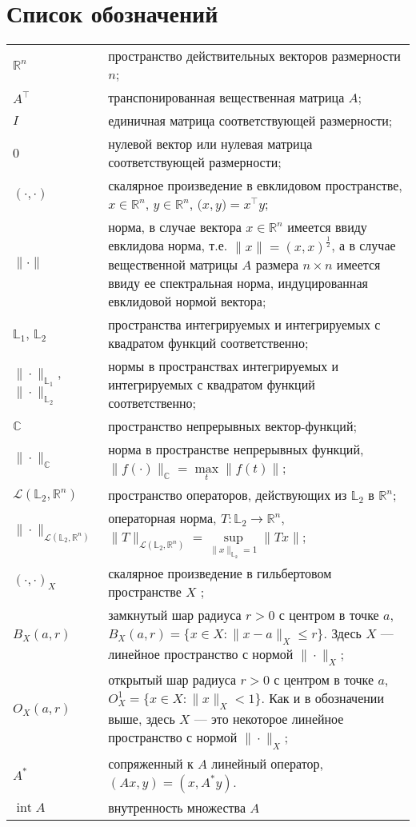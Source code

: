 \documentclass[../main.tex]{subfiles}
\begin{document}
\clearpage
\section*{Список обозначений}
\begin{tabularx}{\textwidth}{lY}
    $\mathbb{R}^n$ & пространство действительных векторов размерности $n$; \\ 
    $A^{\top}$ & транспонированная вещественная матрица $A$; \\ 
    $I$ & единичная матрица соответствующей размерности; \\ 
    $0$ & нулевой вектор или нулевая матрица соответствующей размерности; \\
    $(\cdot,\cdot)$ & скалярное произведение в евклидовом пространстве, $x \in \mathbb{R}^n$, $y \in \mathbb{R}^n$, $ \Big(x, y\Big) = x^{\top} y$; \\
    $\| \cdot\| $ &  норма, в случае вектора $x \in \mathbb{R}^n$ имеется ввиду евклидова норма,  т.е. $\|x\| = (x,x)^{\frac{1}{2}}$, а в случае вещественной  матрицы $A$ размера $n \times n$ имеется ввиду ее спектральная норма, индуцированная евклидовой нормой вектора; \\
    $\mathbb{L}_1$, $\mathbb{L}_2$ & пространства интегрируемых и интегрируемых с квадратом функций соответственно; \\
    $\|\cdot\|_{\mathbb{L}_1}$, $\|\cdot\|_{\mathbb{L}_2}$ & нормы в пространствах интегрируемых и интегрируемых с квадратом функций соответственно; \\
    $ \mathbb{C} $ & пространство непрерывных вектор-функций; \\
    $\|\cdot\|_\mathbb{C}$ & норма в пространстве непрерывных функций, $\|f(\cdot) \|_\mathbb{C} = \max\limits_{t} \|f(t)\|$; \\
    $\mathcal{L}(\mathbb{L}_2, \mathbb{R}^n)$ & пространство операторов, действующих из $\mathbb{L}_2$ в  $\mathbb{R}^n$; \\ 
    $\| \cdot \|_{\mathcal{L}(\mathbb{L}_2, \mathbb{R}^n)}$ &  операторная норма, $T:  \mathbb{L}_2 \to \mathbb{R}^n $, $\| T \|_{\mathcal{L}(\mathbb{L}_2, \mathbb{R}^n)} = \sup\limits_{\|x\|_{\mathbb{L}_2} = 1} \| T x \| $;\\
    $(\cdot,\cdot)_{X}$ & скалярное произведение в гильбертовом пространстве $X$ ; \\
    $B_X(a,r)$ & замкнутый шар радиуса $r>0$ с центром в точке $a$, $B_X(a, r) = \{x\in X: \|x-a\|_X \leqslant r \}$. Здесь $X$ --- линейное пространство с нормой $\|\cdot\|_X$; \\
    $O_{X}(a, r)$  & открытый шар радиуса $r>0$ с центром в точке $a$, $O_{X}^1 = \{x\in X: \|x\|_{X} < 1 \}$. Как и в обозначении выше, здесь $X$ --- это некоторое линейное пространство с нормой $\|\cdot\|_X$; \\
    $ A^* $ & сопряженный к $A$ линейный оператор, $(Ax, y) = (x, A^*y)$. \\
    $ \operatorname{int}A $   & внутренность множества $A$ \\
\end{tabularx}
\end{document}

